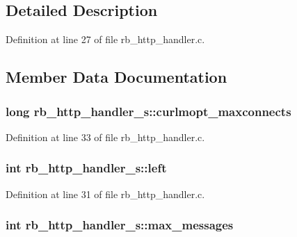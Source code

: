 \subsection{Detailed Description}


Definition at line 27 of file rb\-\_\-http\-\_\-handler.\-c.



\subsection{Member Data Documentation}
\hypertarget{structrb__http__handler__s_a85973abbda4aeb9332a1b59d6aec69a7}{
\subsubsection[{curlmopt\-\_\-maxconnects}]{\setlength{\rightskip}{0pt plus 5cm}long rb\-\_\-http\-\_\-handler\-\_\-s\-::curlmopt\-\_\-maxconnects}}\label{structrb__http__handler__s_a85973abbda4aeb9332a1b59d6aec69a7}


Definition at line 33 of file rb\-\_\-http\-\_\-handler.\-c.

\hypertarget{structrb__http__handler__s_a6239490836609d286669af640028ae71}{
\subsubsection[{left}]{\setlength{\rightskip}{0pt plus 5cm}int rb\-\_\-http\-\_\-handler\-\_\-s\-::left}}\label{structrb__http__handler__s_a6239490836609d286669af640028ae71}


Definition at line 31 of file rb\-\_\-http\-\_\-handler.\-c.

\hypertarget{structrb__http__handler__s_ac8ff888740fc0f4c4365fa08fc7d044f}{
\subsubsection[{max\-\_\-messages}]{\setlength{\rightskip}{0pt plus 5cm}int rb\-\_\-http\-\_\-handler\-\_\-s\-::max\-\_\-messages}}\label{structrb__http__handler__s_ac8ff888740fc0f4c4365fa08fc7d044f}


